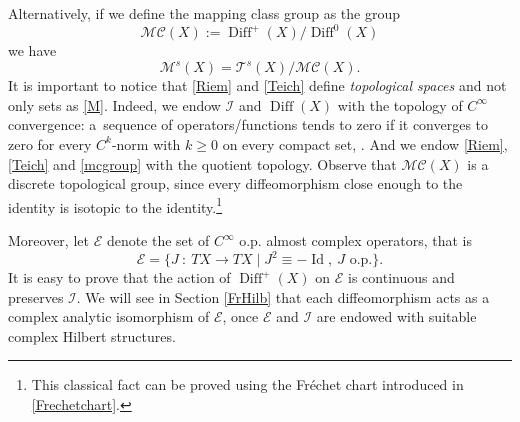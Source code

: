 \documentclass[JEP,XML,SOM,Unicode]{cedram}
\let\mathcal\mathscr
\DeclareMathOperator{\Diff}{Diff}
\DeclareMathOperator{\Id}{Id}
\theoremstyle{plain}
\theoremstyle{definition}
\theoremstyle{remark}
\numberwithin{equation}{section}
\newcommand{\cI}{\mathcal{I}}
\begin{document}
Alternatively, if we define the mapping class group as the group
\begin{equation}
\label{mcgroup}
\mathcal M\mathcal C(X):=\Diff^+(X)\big /\Diff^0(X)
\end{equation}
we have
\begin{equation}
\label{TeichRiem}
\mathcal M^s(X)=\mathcal T^s(X)\big /\mathcal M\mathcal C(X).
\end{equation}
It is important to notice that \eqref{Riem} and \eqref{Teich} define \emph{topological spaces} and not only sets as \eqref{M}. Indeed, we endow $\cI$ and $\Diff(X)$ with the topology of $C^\infty$ convergence: a~sequence of operators/functions tends to zero if it converges to zero for every $C^k$\nobreakdash-norm with $k\geq 0$ on every compact set, \cf \cite{Hamilton}. And we endow \eqref{Riem}, \eqref{Teich} and \eqref{mcgroup} with the quotient topology. Observe that $\mathcal M\mathcal C(X)$ is a discrete topological group, since every diffeomorphism close enough to the identity is isotopic to the identity.\footnote{This classical fact can be proved using the Fréchet chart introduced in \eqref{Frechetchart}.}

Moreover, let $\mathcal E$ denote the set of $C^\infty$ o.p. almost complex operators, that is
\begin{equation}
\label{E}
\mathcal E=\{J\ :\ TX\longrightarrow TX\mid J^2\equiv -\Id,\ J\text{ o.p.}\}.
\end{equation}
It is easy to prove that the action of $\Diff^+(X)$ on $\mathcal E$ is continuous and preserves $\cI$. We will see in Section \ref{FrHilb} that each diffeomorphism acts as a complex analytic isomorphism of $\mathcal E$, once $\mathcal E$ and $\cI$ are endowed with suitable complex Hilbert structures.
\end{document}
